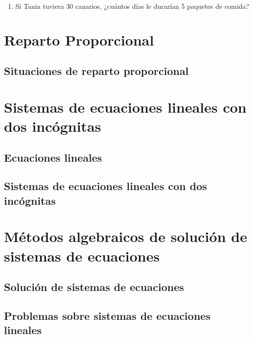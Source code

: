 \documentclass[11pt]{book}
\begin{document}
\begin{enumerate}
\begin{enumerate}
\begin{hoptions}
                \end{hoptions}
          \item Si Tania tuviera 30 canarios, ¿cuántos días le durarían 5 paquetes de comida?\\
        \end{enumerate}
\end{enumerate}
\section{Reparto Proporcional}
\subsection{Situaciones de reparto proporcional}

\section{Sistemas de ecuaciones lineales con dos inc\'ognitas}
\subsection{Ecuaciones lineales}
\subsection{Sistemas de ecuaciones lineales con dos inc\'ognitas}

\section{M\'etodos algebraicos de soluci\'on de sistemas de ecuaciones}
\subsection{Soluci\'on de sistemas de ecuaciones}
\subsection{Problemas sobre sistemas de ecuaciones lineales}
\end{document}
